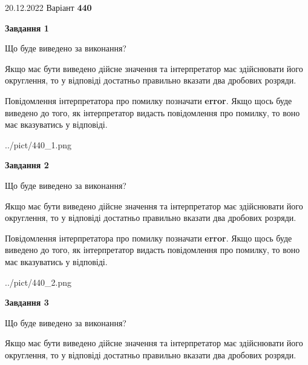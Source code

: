 \documentclass[12pt, ukrainian]{article}
\begin{document}
{20.12.2022 Варіант \No \textbf { 440 }\par}
{
\begin {Large}

{\begin {center}\textbf{Завдання 1}\end {center}}\par
Що буде виведено за виконання? \par

Якщо має бути виведено дійсне значення та інтерпретатор має здійснювати його округлення, 
то у відповіді достатньо правильно вказати два дробових розряди.

Повідомлення інтерпретатора про помилку позначати \textbf{error}.
Якщо щось буде виведено до того, як інтерпретатор видасть повідомлення про помилку, 
то воно має вказуватись у відповіді. \par

\begin{center}
	{../pict/440_1.png}
\end{center}
\newpage

{\begin {center}\textbf{Завдання 2}\end {center}}\par
Що буде виведено за виконання? \par

Якщо має бути виведено дійсне значення та інтерпретатор має здійснювати його округлення, 
то у відповіді достатньо правильно вказати два дробових розряди.

Повідомлення інтерпретатора про помилку позначати \textbf{error}.
Якщо щось буде виведено до того, як інтерпретатор видасть повідомлення про помилку, 
то воно має вказуватись у відповіді. \par

\begin{center}
	{../pict/440_2.png}
\end{center}
\newpage

{\begin {center}\textbf{Завдання 3}\end {center}}\par
Що буде виведено за виконання? \par

Якщо має бути виведено дійсне значення та інтерпретатор має здійснювати його округлення, 
то у відповіді достатньо правильно вказати два дробових розряди.


\end{Large}}
\end{document}
